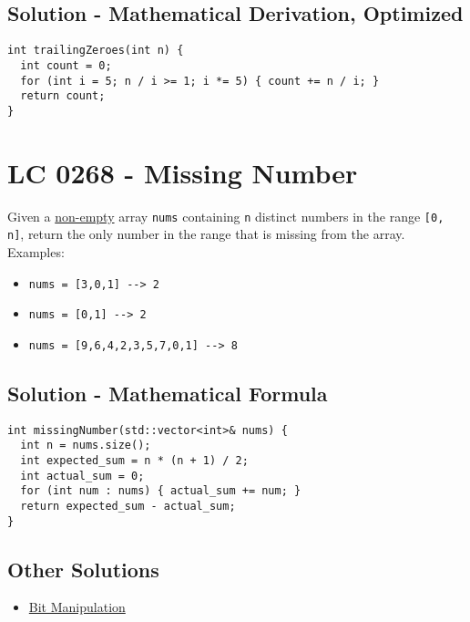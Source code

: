 \subsection*{Solution - Mathematical Derivation, Optimized}
\begin{lstlisting}
int trailingZeroes(int n) {
  int count = 0;
  for (int i = 5; n / i >= 1; i *= 5) { count += n / i; }
  return count;
}
\end{lstlisting}

\section{LC 0268 - Missing Number}
Given a \ul{non-empty} array {\colorbox{CodeBackground}{\lstinline|nums|}} containing {\colorbox{CodeBackground}{\lstinline|n|}} distinct numbers in the range {\colorbox{CodeBackground}{\lstinline|[0, n]|}}, return the only number in the range that is missing from the array.\\

Examples:
\begin{itemize}
\item {\colorbox{CodeBackground}{\lstinline|nums = [3,0,1] --> 2|}}
\item {\colorbox{CodeBackground}{\lstinline|nums = [0,1] --> 2|}}
\item {\colorbox{CodeBackground}{\lstinline|nums = [9,6,4,2,3,5,7,0,1] --> 8|}}
\end{itemize}

\subsection*{Solution - Mathematical Formula}\label{solution:lc0268_mathematical_formula}
\begin{lstlisting}
int missingNumber(std::vector<int>& nums) {
  int n = nums.size();
  int expected_sum = n * (n + 1) / 2;
  int actual_sum = 0;
  for (int num : nums) { actual_sum += num; }
  return expected_sum - actual_sum;
}
\end{lstlisting}

\subsection*{Other Solutions}
\begin{itemize}
\item \hyperref[solution:lc0268_bit_manipulation]{Bit Manipulation}
\end{itemize}

